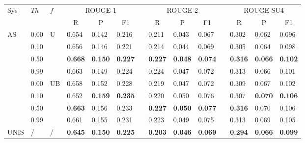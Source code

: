  \setlength{\tabcolsep}{5pt}
\begin{tabular*}{\textwidth}{@{\extracolsep{\fill}}llllllllllllll} 
\hline \hline
\multirow{2}{*}{Sys}	& \multirow{2}{*}{$ Th $} & \multirow{2}{*}{$ f $} & \multicolumn{3}{c}{ROUGE-1}	&& \multicolumn{3}{c}{ROUGE-2}	&& \multicolumn{3}{c}{ROUGE-SU4} \\
\cline{4-6} \cline{8-10} \cline{12-14}
&&& \multicolumn{1}{c}{R}		& \multicolumn{1}{c}{P}	& \multicolumn{1}{c}{F1}	&& \multicolumn{1}{c}{R}	& \multicolumn{1}{c}{P}	& \multicolumn{1}{c}{F1}	&& \multicolumn{1}{c}{R}	& \multicolumn{1}{c}{P} & \multicolumn{1}{c}{F1}\\
\hline

\multirow{8}{*}{AS}	& 0.00	& \multirow{4}{*}{U}	& 0.654	& 0.142	& 0.216	&& 0.211	& 0.043	& 0.067	&& 0.302	& 0.062	& 0.096 \\
	& 0.10	&		& 0.656	& 0.146	& 0.221	&& 0.214	& 0.044	& 0.069	&& 0.305	& 0.064	& 0.098  \\
	& 0.50	&		& \textbf{0.668}	& \textbf{0.150}	& \textbf{0.227}	&& \textbf{0.227}	& \textbf{0.048}	& \textbf{0.074}	&& \textbf{0.316}	& \textbf{0.066}	& \textbf{0.102}  \\
	& 0.99	&		& 0.663	& 0.149	& 0.224	&& 0.224	& 0.047	& 0.072	&& 0.313	& 0.066	& 0.101  \\
\cline{2-14}
	& 0.00	& \multirow{4}{*}{UB} 	& 0.658	& 0.152	& 0.228	&& 0.219	& 0.047	& 0.072	&& 0.309	& 0.067	& 0.102  \\
	& 0.10	&		& 0.652	& \textbf{0.159}	& \textbf{0.235}	&& 0.220	& 0.050	& 0.076	&& 0.307	& \textbf{0.070}	& \textbf{0.106}  \\
	& 0.50	&		& \textbf{0.663}	& 0.156	& 0.233	&& \textbf{0.227}	& \textbf{0.050}	& \textbf{0.077}	&& \textbf{0.316}	& 0.070	& 0.106  \\
	& 0.99	&		& 0.661	& 0.155	& 0.231	&& 0.223	& 0.049	& 0.075	&& 0.313	& 0.069	& 0.105  \\
\hline
UNIS	& /	& /	& \textbf{0.645}	& \textbf{0.150}	& \textbf{0.225}	&& \textbf{0.203}	& \textbf{0.046}	& \textbf{0.069}	&& \textbf{0.294}	& \textbf{0.066}	& \textbf{0.099}  \\

\hline \hline
\end{tabular*}